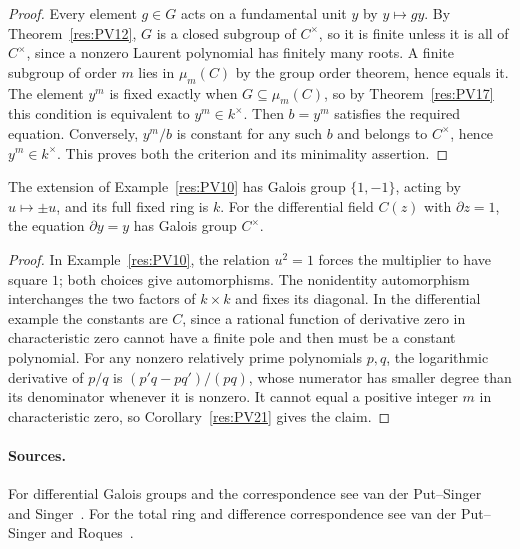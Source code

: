 \begin{proof}
Every element \(g\in G\) acts on a fundamental unit \(y\) by
\(y\mapsto gy\). By Theorem~\ref{res:PV12}, \(G\) is a
closed subgroup of \(C^\times\), so it is finite unless it is
all of \(C^\times\), since a nonzero Laurent polynomial has
finitely many roots. A finite subgroup of order \(m\) lies
in \(\mu_m(C)\) by the group order theorem, hence equals it.
The element \(y^m\) is fixed exactly when \(G\subseteq\mu_m(C)\),
so by Theorem~\ref{res:PV17} this condition is equivalent to
\(y^m\in k^\times\). Then \(b=y^m\) satisfies the required
equation. Conversely, \(y^m/b\) is constant for any such
\(b\) and belongs to \(C^\times\), hence \(y^m\in k^\times\).
This proves both the criterion and its minimality assertion.
\end{proof}

\begin{example}
\label{res:PV22}
The extension of Example~\ref{res:PV10} has Galois group
\(\{1,-1\}\), acting by \(u\mapsto\pm u\), and its full fixed
ring is \(k\). For the differential field \(C(z)\) with
\(\partial z=1\), the equation \(\partial y=y\) has Galois
group \(C^\times\).
\end{example}

\begin{proof}
In Example~\ref{res:PV10}, the relation \(u^2=1\) forces the
multiplier to have square \(1\); both choices give
automorphisms. The nonidentity automorphism interchanges the
two factors of \(k\times k\) and fixes its diagonal.
In the differential example the constants are \(C\), since
a rational function of derivative zero in characteristic zero
cannot have a finite pole and then must be a constant polynomial.
For any nonzero relatively prime polynomials \(p,q\), the
logarithmic derivative of \(p/q\) is
\((p'q-pq')/(pq)\), whose numerator has smaller degree than
its denominator whenever it is nonzero. It cannot equal
a positive integer \(m\) in characteristic zero, so
Corollary~\ref{res:PV21} gives the claim.
\end{proof}

\paragraph{Sources.}
For differential Galois groups and the correspondence see
van der Put--Singer~\cite[Chapter 1, Section 1.4]{vps-differential}
and Singer~\cite[Sections 1.3 and 1.5]{singer}. For the total
ring and difference correspondence see van der Put--Singer
\cite[Chapter 1, Sections 1.2--1.3]{vps-difference} and
Roques~\cite[Sections 5.2--8]{roques}.
